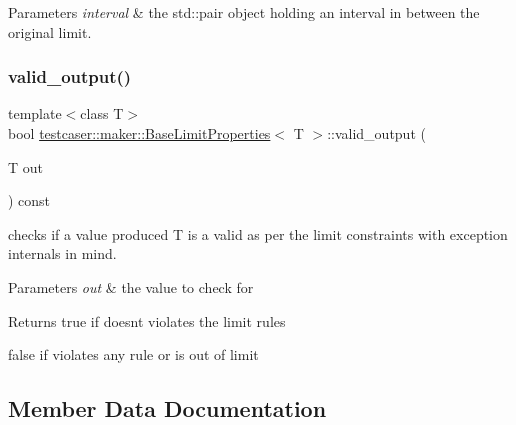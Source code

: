 \begin{DoxyParams}{Parameters}
{\em interval} & the std\+::pair object holding an interval in between the original limit. \\
\hline
\end{DoxyParams}
\mbox{\label{classtestcaser_1_1maker_1_1BaseLimitProperties_a85f2967e2b73ff5fec2bc0053311d5e0}} 
\subsubsection{\texorpdfstring{valid\_output()}{valid\_output()}}
{\footnotesize\ttfamily template$<$class T$>$ \\
bool \mbox{\hyperlink{classtestcaser_1_1maker_1_1BaseLimitProperties}{testcaser\+::maker\+::\+Base\+Limit\+Properties}}$<$ T $>$\+::valid\+\_\+output (\begin{DoxyParamCaption}\item[{T}]{out }\end{DoxyParamCaption}) const\hspace{0.3cm}{\ttfamily [inline]}}



checks if a value produced T is a valid as per the limit constraints with exception internals in mind. 


\begin{DoxyParams}{Parameters}
{\em out} & the value to check for \\
\hline
\end{DoxyParams}
\begin{DoxyReturn}{Returns}
true if doesn\textquotesingle{}t violates the limit rules 

false if violates any rule or is out of limit 
\end{DoxyReturn}


\subsection{Member Data Documentation}
\mbox{\label{classtestcaser_1_1maker_1_1BaseLimitProperties_a5480f2303023b81cc0199eb1f0ba94cd}} 
